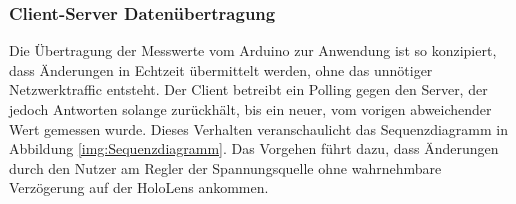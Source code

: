 \subsubsection{Client-Server Datenübertragung}
\label{sec-5-1-1}
Die Übertragung der Messwerte vom Arduino zur Anwendung ist so konzipiert, dass Änderungen in Echtzeit übermittelt werden, ohne das unnötiger Netzwerktraffic entsteht. Der Client betreibt ein Polling gegen den Server, der jedoch Antworten solange zurückhält, bis ein neuer, vom vorigen abweichender Wert gemessen wurde. Dieses Verhalten veranschaulicht das Sequenzdiagramm in Abbildung \ref{img:Sequenzdiagramm}. Das Vorgehen führt dazu, dass Änderungen durch den Nutzer am Regler der Spannungsquelle ohne wahrnehmbare Verzögerung auf der HoloLens ankommen.

\vspace{8px}
\begin{center}
	\\
\end{center}

